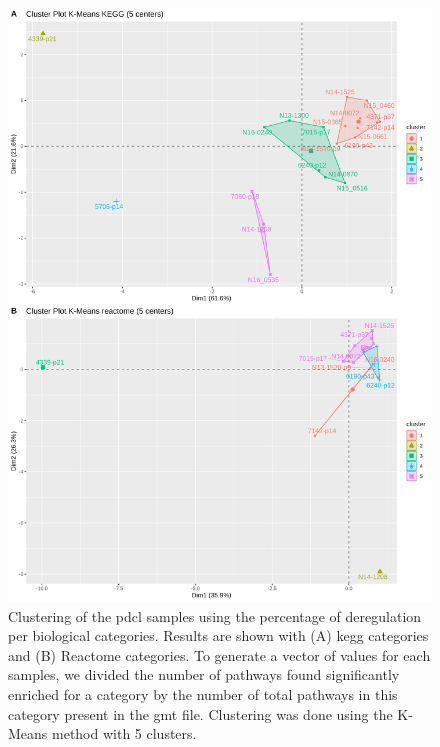 \begin{figure}
    \begin{center}
        \includegraphics[height=0.6\paperheight]{img/plot_cluster_pdcl}
        \caption{
            Clustering of the \acrshort{pdcl} samples using the percentage of deregulation per biological categories.
            Results are shown with (A) \acrshort{kegg} categories and (B) Reactome categories.
            To generate a vector of values for each samples, we divided the number of pathways found significantly enriched for a category by the number of total pathways in this category present in the \acrshort{gmt} file.
            Clustering was done using the K-Means method with 5 clusters.
        }
        \label{fig:cluster-plot-pdcl}
    \end{center}
\end{figure}

